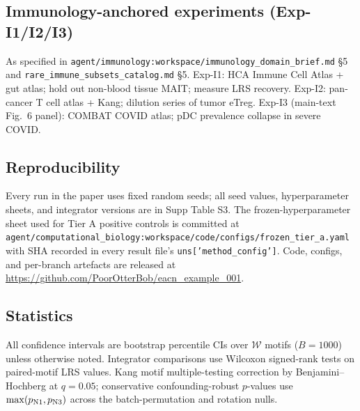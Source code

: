 \subsection{Immunology-anchored experiments (Exp-I1/I2/I3)}

As specified in \texttt{agent/immunology:workspace/immunology\_domain\_brief.md} \S5 and \texttt{rare\_immune\_subsets\_catalog.md} \S5.  Exp-I1: HCA Immune Cell Atlas + gut atlas; hold out non-blood tissue MAIT; measure LRS recovery.  Exp-I2: pan-cancer T cell atlas + Kang; dilution series of tumor eTreg.  Exp-I3 (main-text Fig.~6 panel): COMBAT COVID atlas; pDC prevalence collapse in severe COVID.

\subsection{Reproducibility}

Every run in the paper uses fixed random seeds; all seed values, hyperparameter sheets, and integrator versions are in Supp Table S3.  The frozen-hyperparameter sheet used for Tier A positive controls is committed at \texttt{agent/computational\_biology:workspace/code/configs/frozen\_tier\_a.yaml} with SHA recorded in every result file's \texttt{uns['method\_config']}.  Code, configs, and per-branch artefacts are released at \url{https://github.com/PoorOtterBob/eacn_example_001}.

\subsection{Statistics}

All confidence intervals are bootstrap percentile CIs over $\mathcal{W}$ motifs ($B=1000$) unless otherwise noted.  Integrator comparisons use Wilcoxon signed-rank tests on paired-motif LRS values.  Kang motif multiple-testing correction by Benjamini--Hochberg at $q=0.05$; conservative confounding-robust $p$-values use $\max(p_{\rm N1}, p_{\rm N3})$ across the batch-permutation and rotation nulls.
